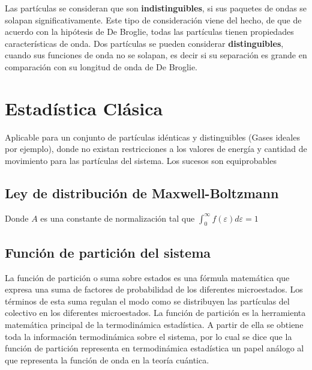 \documentclass[oneside]{book}
\numberwithin{equation}{section}
\numberwithin{figure}{section}
\numberwithin{table}{section}
\begin{document}
				Las partículas se consideran que son \textbf{indistinguibles}, si sus paquetes de ondas se solapan significativamente. Este tipo de consideración viene del hecho, de que de acuerdo con la hipótesis de De Broglie, todas las partículas tienen propiedades características de onda. Dos partículas se pueden considerar \textbf{distinguibles}, cuando sus funciones de onda no se solapan, es decir si su separación es grande en comparación con su longitud de onda de De Broglie.\\	
			
		\section{Estadística Clásica}
		
			Aplicable para un conjunto de partículas idénticas y distinguibles (Gases ideales por ejemplo), donde no existan restricciones a los valores de energía y cantidad de movimiento para las partículas del sistema. Los sucesos son equiprobables
			
			\subsection{Ley de distribución de Maxwell-Boltzmann}

				\begin{center}
				\end{center}
				
				Donde $A$ es una constante de normalización tal que $\displaystyle \int_0^\infty f(\varepsilon)d\varepsilon=1$
				
			\subsection{Función de partición del sistema}
			
				La función de partición o suma sobre estados es una fórmula matemática que expresa una suma de factores de probabilidad de los diferentes microestados. Los términos de esta suma regulan el modo como se distribuyen las partículas del colectivo en los diferentes microestados. La función de partición es la herramienta matemática principal de la termodinámica estadística. A partir de ella se obtiene toda la información termodinámica sobre el sistema, por lo cual se dice que la función de partición representa en termodinámica estadística un papel análogo al que representa la función de onda en la teoría cuántica.\\
				
\end{document}

